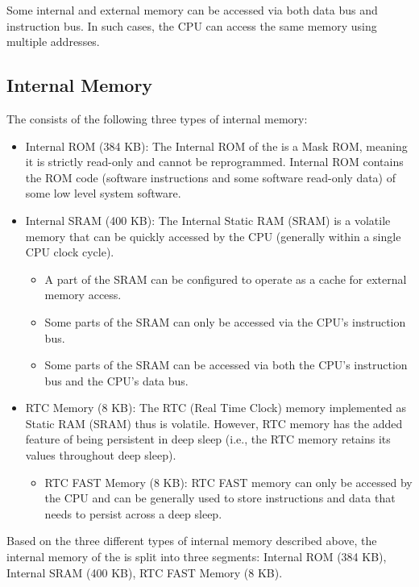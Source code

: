 \documentclass[main\_\_EN.tex]{subfiles}
\begin{document}
Some internal and external memory can be accessed via both data bus and instruction bus. In such cases, the CPU can access the same memory using multiple addresses.


\subsection{Internal Memory}
\label{para:sysmem-internal-memory}

The \chipname{} consists of the following three types of internal memory:

\begin{itemize}
    \item Internal ROM (384 KB): The Internal ROM of the \chipname{} is a Mask ROM, meaning it is strictly read-only and cannot be reprogrammed. Internal ROM contains the ROM code (software instructions and some software read-only data) of some low level system software.
    \item Internal SRAM (400 KB): The Internal Static RAM (SRAM) is a volatile memory that can be quickly accessed by the CPU (generally within a single CPU clock cycle).
    \begin{itemize}
        \item A part of the SRAM can be configured to operate as a cache for external memory access.
        \item Some parts of the SRAM can only be accessed via the CPU's instruction bus. 
        \item Some parts of the SRAM can be accessed via both the CPU's instruction bus and the CPU's data bus.
    \end{itemize}
    \item RTC Memory (8 KB): The RTC (Real Time Clock) memory implemented as Static RAM (SRAM) thus is volatile. However, RTC memory has the added feature of being persistent in deep sleep (i.e., the RTC memory retains its values throughout deep sleep).
    \begin{itemize}
        \item RTC FAST Memory (8 KB): RTC FAST memory can only be accessed by the CPU and can be generally used to store instructions and data that needs to persist across a deep sleep.

    \end{itemize}
\end{itemize}

Based on the three different types of internal memory described above, the internal memory of the \chipname{} is split into three segments: Internal ROM (384 KB), Internal SRAM (400 KB), RTC FAST Memory (8 KB).
\end{document}
